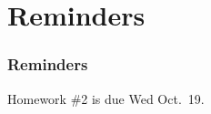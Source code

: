 \documentclass[11pt]{beamer}
\begin{document}
\section{Reminders}

\begin{frame}
  \frametitle{Reminders}
  \Enlarge

  \begin{itemize}
  \myitem Homework \#2 is due Wed Oct.\ 19. 
  \end{itemize}
\end{frame}
\end{document}
